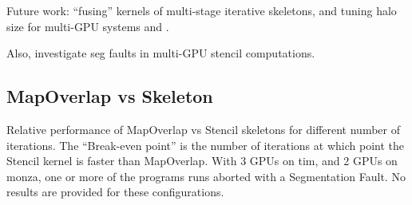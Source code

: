 Future work: ``fusing'' kernels of multi-stage iterative skeletons,
and tuning halo size for multi-GPU systems and .

Also, investigate seg faults in multi-GPU stencil computations.

\label{bibliography}
\printbibliography

\clearpage
\begin{appendices}
\section{MapOverlap vs Skeleton}\label{app:mo-vs-stencil}

Relative performance of MapOverlap vs Stencil skeletons for different
number of iterations. The ``Break-even point'' is the number of
iterations at which point the Stencil kernel is faster than
MapOverlap. With 3 GPUs on tim, and 2 GPUs on monza, one or more of
the programs runs aborted with a Segmentation Fault. No results are
provided for these configurations.

\begin{table}
\footnotesize
\centering

%
\end{table}

\end{appendices}


